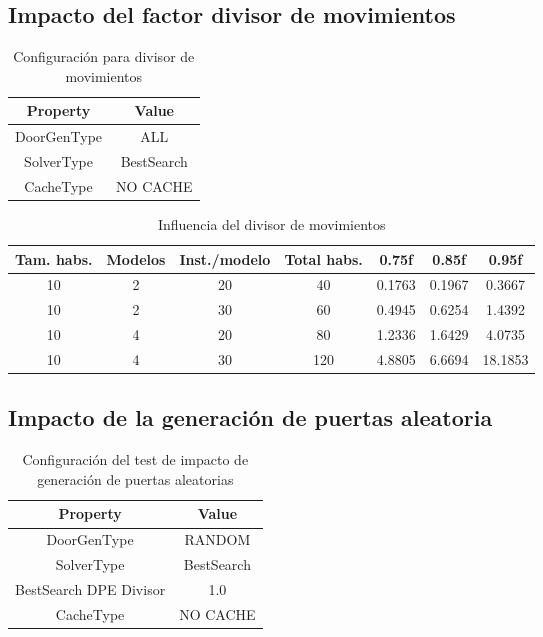 \subsection{Impacto del factor divisor de movimientos}


\begin{table}[H]
\begin{center}
	\begin{tabular}{ | c | c | }
\hline
 		Property & Value \\ \hline
DoorGenType & ALL \\ 
SolverType & BestSearch \\ 
CacheType & NO CACHE \\ 
\hline
	\end{tabular}
\end{center}
\caption{Configuración para divisor de movimientos}
\label{table:cfgdpediv}
\end{table}

\begin{table}[H]
\begin{center}
	\begin{tabular}{ | c | c | c | c | c | c | c | }
\hline
Tam. habs. & Modelos & Inst./modelo & Total habs. & 0.75f & 0.85f & 0.95f\\ \hline 
10 & 2 & 20 & 40 & 0.1763 & 0.1967 & 0.3667 \\ 
10 & 2 & 30 & 60 & 0.4945 & 0.6254 & 1.4392 \\ 
10 & 4 & 20 & 80 & 1.2336 & 1.6429 & 4.0735 \\ 
10 & 4 & 30 & 120 & 4.8805 & 6.6694 & 18.1853 \\ 
\hline
	\end{tabular}
\end{center}
\caption{Influencia del divisor de movimientos}
\label{table:dpediv}
\end{table}



\subsection{Impacto de la generación de puertas aleatoria}

\begin{table}[H]
\begin{center}
	\begin{tabular}{ | c | c | }
\hline
 		Property & Value \\ \hline
DoorGenType & RANDOM \\ 
SolverType & BestSearch \\ 
BestSearch DPE Divisor & 1.0 \\ 
CacheType & NO CACHE \\ 
\hline
	\end{tabular}
\end{center}
\caption{Configuración del test de impacto de generación de puertas aleatorias}
\label{table:cfg-randoors}
\end{table}


